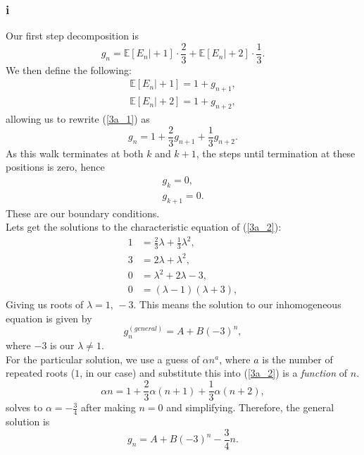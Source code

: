 \documentclass{article}
\begin{document}
\subsubsection{i}
Our first step decomposition is 
\begin{equation}
    g_n = \mathbb{E}[E_n\vert+1]\cdot \frac{2}{3} +  \mathbb{E}[E_n\vert+2]\cdot \frac{1}{3}.\label{3a_1}
\end{equation}
We then define the following:
\begin{align}
     \mathbb{E}[E_n\vert +1] = 1+g_{n+1},\\
      \mathbb{E}[E_n\vert+2] = 1+g_{n+2},
\end{align}
allowing us to rewrite (\ref{3a_1}) as
\begin{equation}
    g_n = 1 + \frac{2}{3}g_{n+1} + \frac{1}{3}g_{n+2}. \label{3a_2}
\end{equation}
As this walk terminates at both $k$ and $k+1$, the steps until termination at these positions is zero, hence
\begin{align}
    g_k = 0,\label{3a_b1}\\
    g_{k+1} = 0.\label{3a_b2}
\end{align}
These are our boundary conditions.\\
Lets get the solutions to the characteristic equation of (\ref{3a_2}):
\begin{align}
    1 &= \frac{2}{3}\lambda + \frac{1}{3}\lambda^2,\\
    3 &= 2\lambda+\lambda^2,\\
    0 &= \lambda^2+2\lambda-3,\\
    0 &= (\lambda-1)(\lambda+3),
\end{align}
Giving us roots of $\lambda=1,\,-3$. This means the solution to our inhomogeneous equation is given by
\begin{equation}
    g_n^{(general)} = A+B(-3)^n,
\end{equation}
where $-3$ is our $\lambda\neq 1$.\\
For the particular solution, we use a guess of $\alpha n^a$, where $a$ is the number of repeated roots ($1$, in our case) and substitute this into (\ref{3a_2}) is a \textit{function} of $n$.
\begin{equation}
    \alpha n = 1 + \frac{2}{3}\alpha(n+1) + \frac{1}{3}\alpha(n+2),
\end{equation}
solves to $\alpha = -\frac{3}{4}$ after making $n=0$ and simplifying. Therefore, the general solution is
\begin{equation}
    g_n = A + B(-3)^n - \frac{3}{4}n.
\end{equation}
\end{document}

